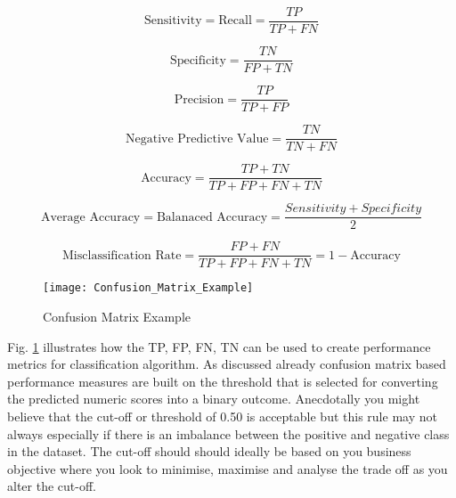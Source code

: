 \begin{equation} \label{eq:Sensitivity}
\text{Sensitivity} = \text{Recall} = \frac{TP}{TP + FN}
\end{equation}

\begin{equation} \label{eq:Specificity}
\text{Specificity} = \frac{TN}{FP + TN}
\end{equation}

\begin{equation} \label{eq:precision}
\text{Precision} = \frac{TP}{TP + FP}
\end{equation}

\begin{equation} \label{eq:npv}
\text{Negative Predictive Value} = \frac{TN}{TN + FN}
\end{equation}

\begin{equation} \label{eq:Accuracy}
\text{Accuracy} = \frac{TP + TN}{TP + FP + FN + TN}
\end{equation}

\begin{equation} \label{eq:Balanaced Accuracy}
\text{Average Accuracy} = \text{Balanaced Accuracy} = \frac{Sensitivity + Specificity}{2}
\end{equation}

\begin{equation} \label{eq:Misclassification Rate}
\text{Misclassification Rate} =  \frac{FP + FN}{TP + FP + FN + TN} = 1 - \text{Accuracy}
\end{equation}

\begin{figure}[H]
	\texttt{[image: Confusion\_Matrix\_Example]}
	\caption[Confusion Matrix Example]
	{Confusion Matrix Example}
	\label{fig:ConfusionMatrixExample}
\end{figure}

Fig. \ref{fig:ConfusionMatrixExample} illustrates how the TP, FP, FN, TN can be used to create performance metrics for classification algorithm. As discussed already confusion matrix based performance measures are built on the threshold that is selected for converting the predicted numeric scores into a binary outcome. Anecdotally you might believe that the cut-off or threshold of 0.50 is acceptable but this rule may not always especially if there is an imbalance between the positive and negative class in the dataset. The cut-off should should ideally be based on you business objective where you look to minimise, maximise and analyse the trade off as you alter the cut-off. 

